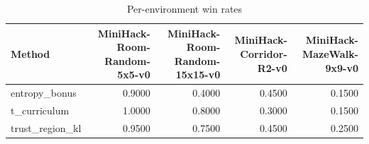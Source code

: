 \begin{table}[htbp]
\centering
\caption{Per-environment win rates}
\label{tab:per-env}
\begin{tabular}{lrrrr}
\toprule
\textbf{Method} & \textbf{MiniHack-Room-Random-5x5-v0} & \textbf{MiniHack-Room-Random-15x15-v0} & \textbf{MiniHack-Corridor-R2-v0} & \textbf{MiniHack-MazeWalk-9x9-v0} \\
\midrule
entropy\_bonus & 0.9000 & 0.4000 & 0.4500 & 0.1500 \\
t\_curriculum & 1.0000 & 0.8000 & 0.3000 & 0.1500 \\
trust\_region\_kl & 0.9500 & 0.7500 & 0.4500 & 0.2500 \\
\bottomrule
\end{tabular}
\end{table}